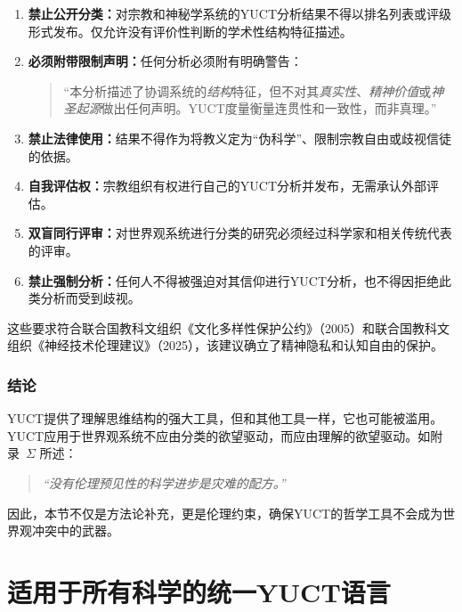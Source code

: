 \documentclass[11pt,a4paper]{article}
\begin{document}
	\begin{enumerate}[label=(\arabic*)]
		\item \textbf{禁止公开分类：}对宗教和神秘学系统的YUCT分析结果不得以排名列表或评级形式发布。仅允许没有评价性判断的学术性结构特征描述。
		
		\item \textbf{必须附带限制声明：}任何分析必须附有明确警告：
		\begin{quote}
			“本分析描述了协调系统的\emph{结构}特征，但不对其\emph{真实性}、\emph{精神价值}或\emph{神圣起源}做出任何声明。YUCT度量衡量连贯性和一致性，而非真理。”
		\end{quote}
		
		\item \textbf{禁止法律使用：}结果不得作为将教义定为“伪科学”、限制宗教自由或歧视信徒的依据。
		
		\item \textbf{自我评估权：}宗教组织有权进行自己的YUCT分析并发布，无需承认外部评估。
		
		\item \textbf{双盲同行评审：}对世界观系统进行分类的研究必须经过科学家和相关传统代表的评审。
		
		\item \textbf{禁止强制分析：}任何人不得被强迫对其信仰进行YUCT分析，也不得因拒绝此类分析而受到歧视。
	\end{enumerate}
	
	这些要求符合联合国教科文组织《文化多样性保护公约》（2005）和联合国教科文组织《神经技术伦理建议》（2025），该建议确立了精神隐私和认知自由的保护。
	
	\subsubsection{结论}
	
	YUCT提供了理解思维结构的强大工具，但和其他工具一样，它也可能被滥用。YUCT应用于世界观系统不应由分类的欲望驱动，而应由理解的欲望驱动。如附录~$\Sigma$ 所述：
	
	\begin{quote}
		\itshape
		“没有伦理预见性的科学进步是灾难的配方。”
	\end{quote}
	
	因此，本节不仅是方法论补充，更是伦理约束，确保YUCT的哲学工具不会成为世界观冲突中的武器。
	
	
	\section{适用于所有科学的统一YUCT语言}
	
\end{document}
